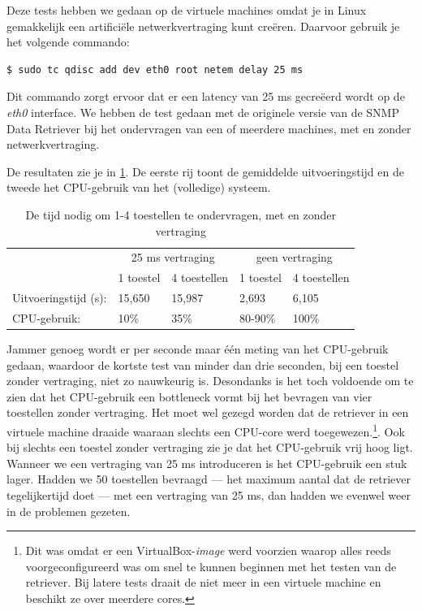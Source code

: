 Deze tests hebben we gedaan op de virtuele machines omdat je in Linux gemakkelijk een artificiële netwerkvertraging kunt creëren.
Daarvoor gebruik je het volgende commando:

\begin{lstlisting}[language=bash, caption={Artificiële netwerkvertraging creëren in Linux}]
$ sudo tc qdisc add dev eth0 root netem delay 25 ms
\end{lstlisting}

Dit commando zorgt ervoor dat er een latency van 25 ms gecreëerd wordt op de \textit{eth0} interface.
We hebben de test gedaan met de originele versie van de SNMP Data Retriever bij het ondervragen van een of meerdere machines,
met en zonder netwerkvertraging.

De resultaten zie je in \cref{tabel-latency}.
De eerste rij toont de gemiddelde uitvoeringstijd en de tweede het CPU-gebruik van het (volledige) systeem.

\begin{table}[h]
\centering
\begin{tabular}{@{}lllll@{}}
\toprule
                      & \multicolumn{2}{c}{25 ms vertraging} & \multicolumn{2}{c}{geen vertraging} \\
                      & 1 toestel       & 4 toestellen       & 1 toestel       & 4 toestellen      \\ \midrule
Uitvoeringstijd (s):  & 15,650          & 15,987             & 2,693           & 6,105             \\
CPU-gebruik:          & 10\%            & 35\%               & 80-90\%         & 100\%    		   \\ \bottomrule
\end{tabular}
\caption{De tijd nodig om 1-4 toestellen te ondervragen, met en zonder vertraging}
\label{tabel-latency}
\end{table}

Jammer genoeg wordt er per seconde maar één meting van het CPU-gebruik gedaan, waardoor
de kortste test van minder dan drie seconden, bij een toestel zonder vertraging, niet zo nauwkeurig is.
Desondanks is het toch voldoende om te zien dat het CPU-gebruik een bottleneck vormt bij het bevragen van vier toestellen zonder vertraging.
Het moet wel gezegd worden dat de retriever in een virtuele machine draaide waaraan slechts een CPU-core werd toegewezen.\footnote{
	Dit was omdat er een VirtualBox-\textit{image} werd voorzien waarop alles reeds voorgeconfigureerd was om snel te kunnen beginnen met het testen van de retriever.
	Bij latere tests draait de \nwmretriever{} niet meer in een virtuele machine en beschikt ze over meerdere cores.
}.
Ook bij slechts een toestel zonder vertraging zie je dat het CPU-gebruik vrij hoog ligt.
Wanneer we een vertraging van 25 ms introduceren is het CPU-gebruik een stuk lager.
Hadden we 50 toestellen bevraagd --- het maximum aantal dat de retriever tegelijkertijd doet --- met een vertraging van 25 ms,
dan hadden we evenwel weer in de problemen gezeten.

